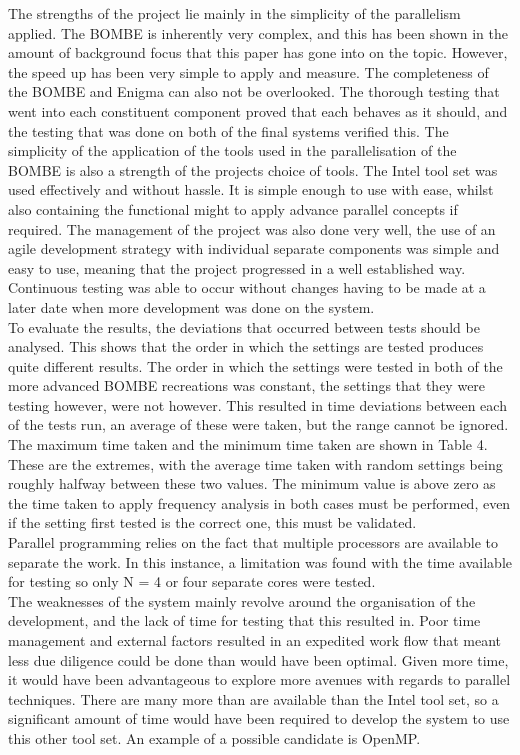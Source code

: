 \documentclass[12pt,a4paper]{article}
\begin{document}
The strengths of the project lie mainly in the simplicity of the parallelism applied. The BOMBE is inherently very complex, and this has been shown in the amount of background focus that this paper has gone into on the topic. However, the speed up has been very simple to apply and measure. The completeness of the BOMBE and Enigma can also not be overlooked. The thorough testing that went into each constituent component proved that each behaves as it should, and the testing that was done on both of the final systems verified this. The simplicity of the application of the tools used in the parallelisation of the BOMBE is also a strength of the projects choice of tools. The Intel tool set was used effectively and without hassle. It is simple enough to use with ease, whilst also containing the functional might to apply advance parallel concepts if required. The management of the project was also done very well, the use of an agile development strategy with individual separate components was simple and easy to use, meaning that the project progressed in a well established way. Continuous testing was able to occur without changes having to be made at a later date when more development was done on the system. \\

To evaluate the results, the deviations that occurred between tests should be analysed. This shows that the order in which the settings are tested produces quite different results. The order in which the settings were tested in both of the more advanced BOMBE recreations was constant, the settings that they were testing however, were not however. This resulted in time deviations between each of the tests run, an average of these were taken, but the range cannot be ignored. The maximum time taken and the minimum time taken are shown in Table 4. These are the extremes, with the average time taken with random settings being roughly halfway between these two values. The minimum value is above zero as the time taken to apply frequency analysis in both cases must be performed, even if the setting first tested is the correct one, this must be validated.\\

Parallel programming relies on the fact that multiple processors are available to separate the work. In this instance, a limitation was found with the time available for testing so only N = 4 or four separate cores were tested.\\

The weaknesses of the system mainly revolve around the organisation of the development, and the lack of time for testing that this resulted in. Poor time management and external factors resulted in an expedited work flow that meant less due diligence could be done than would have been optimal. Given more time, it would have been advantageous to explore more avenues with regards to parallel techniques. There are many more than are available than the Intel tool set, so a significant amount of time would have been required to develop the system to use this other tool set. An example of a possible candidate is OpenMP.\\
\end{document}

